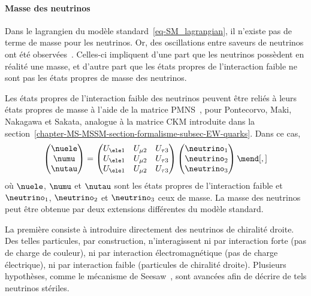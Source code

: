 \paragraph{Masse des neutrinos}
Dans le lagrangien du modèle standard~\eqref{eq-SM_lagrangian},
il n'existe pas de terme de masse pour les neutrinos.
Or, des oscillations entre saveurs de neutrinos ont été observées~\cite{neutrino_oscillations_1,neutrino_oscillations_2}.
Celles-ci impliquent d'une part que les neutrinos possèdent en réalité une masse, et d'autre part que les états propres de l'interaction faible ne sont pas les états propres de masse des neutrinos.
\par
Les états propres de l'interaction faible des neutrinos peuvent être reliés à leurs états propres de masse à l'aide de la matrice PMNS~\cite{PMNS_MNS}, pour Pontecorvo, Maki, Nakagawa et Sakata, analogue à la matrice CKM introduite dans la section~\ref{chapter-MS-MSSM-section-formalisme-subsec-EW-quarks}.
Dans ce cas,
\begin{equation}
\begin{pmatrix}
\nuele \\ \numu \\ \nutau
\end{pmatrix}
=
\begin{pmatrix}
U_{\ele 1} & U_{\mu 2} & U_{\tau 3} \\
U_{\ele 1} & U_{\mu 2} & U_{\tau 3} \\
U_{\ele 1} & U_{\mu 2} & U_{\tau 3} \\
\end{pmatrix}
\begin{pmatrix}
\neutrino_1 \\ \neutrino_2 \\ \neutrino_3
\end{pmatrix}
\mend[,]
\end{equation}
où $\nuele$, $\numu$ et $\nutau$ sont les états propres de l'interaction faible et $\neutrino_1$, $\neutrino_2$ et $\neutrino_3$ ceux de masse.
La masse des neutrinos peut être obtenue par deux extensions différentes du modèle standard.
\par
La première consiste à introduire directement des neutrinos de chiralité droite.
Des telles particules, par construction, n'interagissent ni par interaction forte (pas de charge de couleur), ni par interaction électromagnétique (pas de charge électrique), ni par interaction faible (particules de chiralité droite).
Plusieurs hypothèses, comme le mécanisme de Seesaw~\cite{neutrino_masses_1,neutrino_masses_2,neutrino_masses_3,neutrino_masses_4,neutrino_masses_5}, sont avancées afin de décrire de tels neutrinos stériles.
